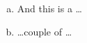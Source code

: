 \documentclass{article}
\begin{document}
\begin{enumerate}[a)]
      \item And this is a \ldots
      \item \ldots couple of \ldots
    \end{enumerate}
\end{document}
